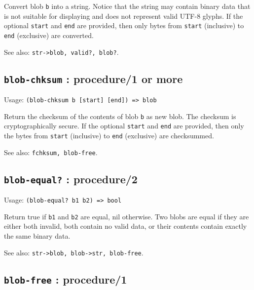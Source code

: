 \documentclass[
]{article}
\newcommand{\passthrough}[1]{#1}
\begin{document}
Convert blob \passthrough{\lstinline!b!} into a string. Notice that the
string may contain binary data that is not suitable for displaying and
does not represent valid UTF-8 glyphs. If the optional
\passthrough{\lstinline!start!} and \passthrough{\lstinline!end!} are
provided, then only bytes from \passthrough{\lstinline!start!}
(inclusive) to \passthrough{\lstinline!end!} (exclusive) are converted.

See also: \passthrough{\lstinline!str->blob, valid?, blob?!}.

\hypertarget{blob-chksum-procedure1-or-more-1}{%
\subsection{\texorpdfstring{\texttt{blob-chksum} : procedure/1 or
more}{blob-chksum : procedure/1 or more}}\label{blob-chksum-procedure1-or-more-1}}

Usage: \passthrough{\lstinline!(blob-chksum b [start] [end]) => blob!}

Return the checksum of the contents of blob \passthrough{\lstinline!b!}
as new blob. The checksum is cryptographically secure. If the optional
\passthrough{\lstinline!start!} and \passthrough{\lstinline!end!} are
provided, then only the bytes from \passthrough{\lstinline!start!}
(inclusive) to \passthrough{\lstinline!end!} (exclusive) are
checksummed.

See also: \passthrough{\lstinline!fchksum, blob-free!}.

\hypertarget{blob-equal-procedure2-1}{%
\subsection{\texorpdfstring{\texttt{blob-equal?} :
procedure/2}{blob-equal? : procedure/2}}\label{blob-equal-procedure2-1}}

Usage: \passthrough{\lstinline!(blob-equal? b1 b2) => bool!}

Return true if \passthrough{\lstinline!b1!} and
\passthrough{\lstinline!b2!} are equal, nil otherwise. Two blobs are
equal if they are either both invalid, both contain no valid data, or
their contents contain exactly the same binary data.

See also: \passthrough{\lstinline!str->blob, blob->str, blob-free!}.

\hypertarget{blob-free-procedure1-1}{%
\subsection{\texorpdfstring{\texttt{blob-free} :
procedure/1}{blob-free : procedure/1}}\label{blob-free-procedure1-1}}
\end{document}
